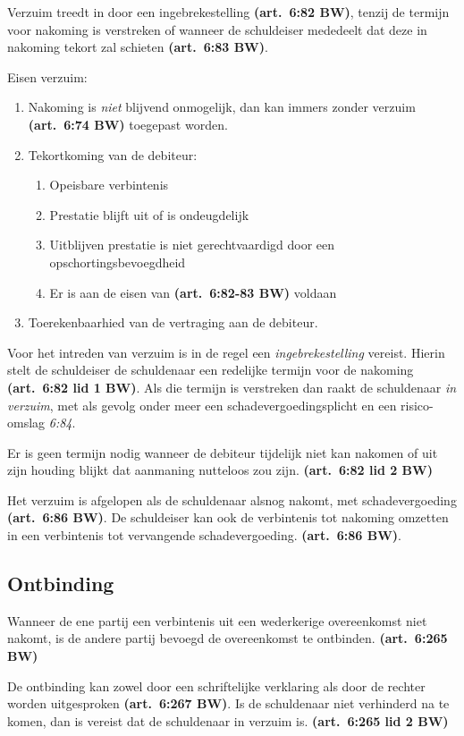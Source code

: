 \documentclass[a4paper]{article}
\newcommand{\art}[1]{\textbf{(art.~#1 BW)}\xspace}
\begin{document}
Verzuim treedt in door een ingebrekestelling \art{6:82}, tenzij de termijn
voor nakoming is verstreken of wanneer de schuldeiser mededeelt dat deze in
nakoming tekort zal schieten \art{6:83}.

Eisen verzuim:
\begin{enumerate}
  \item Nakoming is \emph{niet} blijvend onmogelijk, dan kan immers zonder
    verzuim \art{6:74} toegepast worden.
  \item Tekortkoming van de debiteur:
    \begin{enumerate}
      \item Opeisbare verbintenis
      \item Prestatie blijft uit of is ondeugdelijk
      \item Uitblijven prestatie is niet gerechtvaardigd door een
        opschortingsbevoegdheid
      \item Er is aan de eisen van \art{6:82-83} voldaan
    \end{enumerate}
  \item Toerekenbaarhied van de vertraging aan de debiteur.
\end{enumerate}

Voor het intreden van verzuim is in de regel een \emph{ingebrekestelling}
vereist. Hierin stelt de schuldeiser de schuldenaar een redelijke termijn voor
de nakoming \art{6:82 lid 1}. Als die termijn is verstreken dan raakt de
schuldenaar \emph{in verzuim}, met als gevolg onder meer een
schadevergoedingsplicht en een risico-omslag \emph{6:84}.

Er is geen termijn nodig wanneer de debiteur tijdelijk niet kan nakomen of uit
zijn houding blijkt dat aanmaning nutteloos zou zijn. \art{6:82 lid 2}

Het verzuim is afgelopen als de schuldenaar alsnog nakomt, met
schadevergoeding \art{6:86}. De schuldeiser kan ook de verbintenis tot
nakoming omzetten in een verbintenis tot vervangende schadevergoeding.
\art{6:86}.

\subsection{Ontbinding}

Wanneer de ene partij een verbintenis uit een wederkerige overeenkomst niet
nakomt, is de andere partij bevoegd de overeenkomst te ontbinden. \art{6:265}

De ontbinding kan zowel door een schriftelijke verklaring als door de rechter
worden uitgesproken \art{6:267}. Is de schuldenaar niet verhinderd na te
komen, dan is vereist dat de schuldenaar in verzuim is. \art{6:265 lid 2}
\end{document}
